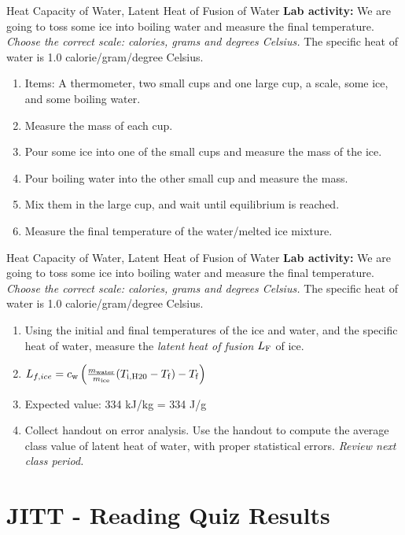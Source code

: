 \documentclass{beamer}
\begin{document}
\begin{frame}{Heat Capacity of Water, Latent Heat of Fusion of Water}
\small
\textbf{Lab activity:} We are going to toss some ice into boiling water and measure the final temperature.  \textit{Choose the correct scale: calories, grams and degrees Celsius.} \alert{The specific heat of water is 1.0 calorie/gram/degree Celsius}.
\begin{enumerate}
\item Items: A thermometer, two small cups and one large cup, a scale, some ice, and some boiling water.
\item Measure the mass of each cup.
\item Pour some ice into one of the small cups and measure the mass of the ice.
\item Pour boiling water into the other small cup and measure the mass.
\item Mix them in the large cup, and wait until equilibrium is reached.
\item Measure the final temperature of the water/melted ice mixture.
\end{enumerate}
\end{frame}

\begin{frame}{Heat Capacity of Water, Latent Heat of Fusion of Water}
\small
\textbf{Lab activity:} We are going to toss some ice into boiling water and measure the final temperature.  \textit{Choose the correct scale: calories, grams and degrees Celsius.} \alert{The specific heat of water is 1.0 calorie/gram/degree Celsius}.
\begin{enumerate}
\item Using the initial and final temperatures of the ice and water, and the specific heat of water, measure the \textit{latent heat of fusion} $L_{\rm F}$ of ice.
\item $L_{f,ice} = c_{\rm w} \left( \frac{m_{\rm water}}{m_{\rm ice}} (T_{\rm i,H20} - T_{\rm f}) - T_{\rm f} \right)$
\item Expected value: 334 kJ/kg = 334 J/g
\item Collect handout on error analysis.  Use the handout to compute the average class value of latent heat of water, with proper statistical errors.  \textit{Review next class period.}
\end{enumerate}
\end{frame}

\section{JITT - Reading Quiz Results}
\end{document}
